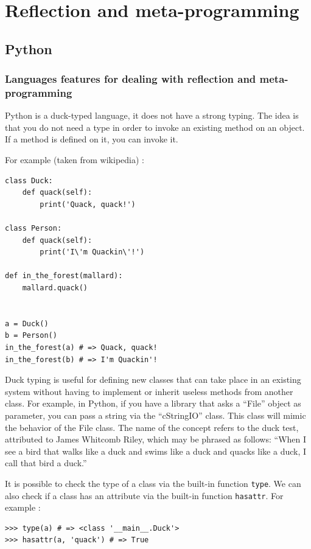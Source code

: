\documentclass[a4paper,10pt]{article}
\begin{document}
\section{Reflection and meta-programming}

\subsection{Python}
\setpy{}
\subsubsection{Languages features for dealing with reflection and meta-programming}
\setpy{}
Python is a duck-typed language, it does not have a strong typing.
The idea is that you do not need a type in order to invoke an existing method on an object.
If a method is defined on it, you can invoke it.

For example (taken from wikipedia) :

\begin{lstlisting}
class Duck:
    def quack(self):
        print('Quack, quack!')

class Person:
    def quack(self):
        print('I\'m Quackin\'!')

def in_the_forest(mallard):
    mallard.quack()


a = Duck()
b = Person()
in_the_forest(a) # => Quack, quack!
in_the_forest(b) # => I'm Quackin'!
\end{lstlisting}

Duck typing is useful for defining new classes that can take place in an existing system without having to implement or inherit useless methods from another class. For example, in Python, if you have a library that asks a “File” object as parameter, you can pass a string via the  “cStringIO” class. This class will mimic the behavior of the File class. The name of the concept refers to the duck test, attributed to James Whitcomb Riley, which may be phrased as follows: “When I see a bird that walks like a duck and swims like a duck and quacks like a duck, I call that bird a duck.”

It is possible to check the type of a class via the built-in function \lstinline|type|.
We can also check if a class has an attribute via the built-in function \lstinline|hasattr|.
For example :

\begin{lstlisting}
>>> type(a) # => <class '__main__.Duck'>
>>> hasattr(a, 'quack') # => True
\end{lstlisting}
\end{document}
